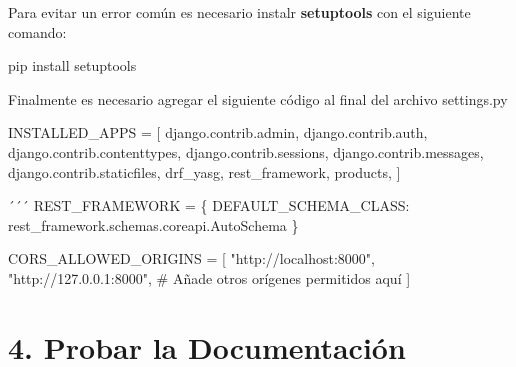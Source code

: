 \documentclass[
  a4paper,
  DIV=11,
  numbers=noendperiod,
  onepage,
  openany]{scrreprt}
\newenvironment{Shaded}{\begin{snugshade}}{\end{snugshade}}
\newcommand{\CommentTok}[1]{\textcolor[rgb]{0.37,0.37,0.37}{#1}}
\newcommand{\ExtensionTok}[1]{\textcolor[rgb]{0.00,0.23,0.31}{#1}}
\newcommand{\NormalTok}[1]{\textcolor[rgb]{0.00,0.23,0.31}{#1}}
\newcommand{\OperatorTok}[1]{\textcolor[rgb]{0.37,0.37,0.37}{#1}}
\newcommand{\StringTok}[1]{\textcolor[rgb]{0.13,0.47,0.30}{#1}}
\begin{document}
\begin{tcolorbox}
\begin{tcolorbox}
Para evitar un error común es necesario instalr \textbf{setuptools} con
el siguiente comando:

\begin{Shaded}
\begin{Highlighting}[]
\ExtensionTok{pip}\NormalTok{ install setuptools}
\end{Highlighting}
\end{Shaded}

\end{tcolorbox}

Finalmente es necesario agregar el siguiente código al final del archivo
settings.py

\begin{Shaded}
\begin{Highlighting}[]
\NormalTok{INSTALLED\_APPS }\OperatorTok{=}\NormalTok{ [}
    \StringTok{\textquotesingle{}django.contrib.admin\textquotesingle{}}\NormalTok{,}
    \StringTok{\textquotesingle{}django.contrib.auth\textquotesingle{}}\NormalTok{,}
    \StringTok{\textquotesingle{}django.contrib.contenttypes\textquotesingle{}}\NormalTok{,}
    \StringTok{\textquotesingle{}django.contrib.sessions\textquotesingle{}}\NormalTok{,}
    \StringTok{\textquotesingle{}django.contrib.messages\textquotesingle{}}\NormalTok{,}
    \StringTok{\textquotesingle{}django.contrib.staticfiles\textquotesingle{}}\NormalTok{,}
    \StringTok{\textquotesingle{}drf\_yasg\textquotesingle{}}\NormalTok{,}
    \StringTok{\textquotesingle{}rest\_framework\textquotesingle{}}\NormalTok{,}
    \StringTok{\textquotesingle{}products\textquotesingle{}}\NormalTok{,}
\NormalTok{]}

\NormalTok{´´´}
\NormalTok{REST\_FRAMEWORK }\OperatorTok{=}\NormalTok{ \{}
    \StringTok{\textquotesingle{}DEFAULT\_SCHEMA\_CLASS\textquotesingle{}}\NormalTok{: }\StringTok{\textquotesingle{}rest\_framework.schemas.coreapi.AutoSchema\textquotesingle{}}
\NormalTok{\}}

\NormalTok{CORS\_ALLOWED\_ORIGINS }\OperatorTok{=}\NormalTok{ [}
    \StringTok{"http://localhost:8000"}\NormalTok{,}
    \StringTok{"http://127.0.0.1:8000"}\NormalTok{,}
    \CommentTok{\# Añade otros orígenes permitidos aquí}
\NormalTok{]}
\end{Highlighting}
\end{Shaded}

\section{4. Probar la Documentación}\label{probar-la-documentaciuxf3n}


\end{tcolorbox}
\end{document}
